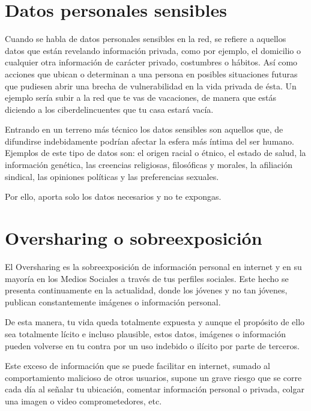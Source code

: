 \documentclass[
  a4paper,
  openany]{book}
\begin{document}
\hypertarget{datos-personales-sensibles}{%
\section{Datos personales sensibles}\label{datos-personales-sensibles}}

Cuando se habla de datos personales sensibles en la red, se refiere a aquellos datos que están revelando información privada, como por ejemplo, el domicilio o cualquier otra información de carácter privado, costumbres o hábitos. Así como acciones que ubican o determinan a una persona en posibles situaciones futuras que pudiesen abrir una brecha de vulnerabilidad en la vida privada de ésta. Un ejemplo sería subir a la red que te vas de vacaciones, de manera que estás diciendo a los ciberdelincuentes que tu casa estará vacía.

Entrando en un terreno más técnico los datos sensibles son aquellos que, de difundirse indebidamente podrían afectar la esfera más íntima del ser humano. Ejemplos de este tipo de datos son: el origen racial o étnico, el estado de salud, la información genética, las creencias religiosas, filosóficas y morales, la afiliación sindical, las opiniones políticas y las preferencias sexuales.

Por ello, aporta solo los datos necesarios y no te expongas.

\hypertarget{oversharing-o-sobreexposiciuxf3n}{%
\section{Oversharing o sobreexposición}\label{oversharing-o-sobreexposiciuxf3n}}

El Oversharing es la sobreexposición de información personal en internet y en su mayoría en los Medios Sociales a través de tus perfiles sociales. Este hecho se presenta continuamente en la actualidad, donde los jóvenes y no tan jóvenes, publican constantemente imágenes o información personal.

De esta manera, tu vida queda totalmente expuesta y aunque el propósito de ello sea totalmente lícito e incluso plausible, estos datos, imágenes o información pueden volverse en tu contra por un uso indebido o ilícito por parte de terceros.

Este exceso de información que se puede facilitar en internet, sumado al comportamiento malicioso de otros usuarios, supone un grave riesgo que se corre cada día al señalar tu ubicación, comentar información personal o privada, colgar una imagen o video comprometedores, etc.
\end{document}
